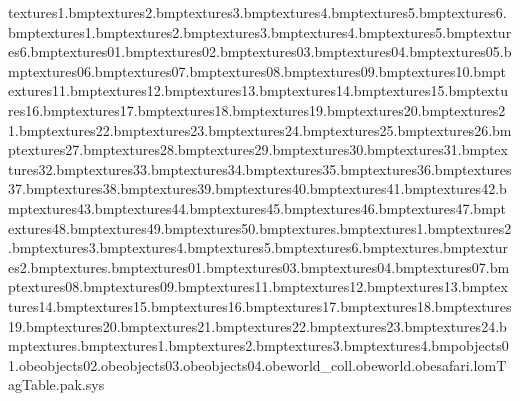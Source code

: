 textures\grassedge1.bmp textures\grassedge2.bmp textures\grassedge3.bmp textures\grassedge4.bmp textures\grassedge5.bmp textures\grassedge6.bmp textures\grassshad1.bmp textures\grassshad2.bmp textures\grassshad3.bmp textures\grassshad4.bmp textures\grassshad5.bmp textures\grassshad6.bmp textures\rockent01.bmp textures\rockent02.bmp textures\rockent03.bmp textures\rockent04.bmp textures\rockent05.bmp textures\rockent06.bmp textures\rockent07.bmp textures\rockent08.bmp textures\rockent09.bmp textures\rockent10.bmp textures\rockent11.bmp textures\rockent12.bmp textures\rockent13.bmp textures\rockent14.bmp textures\rockent15.bmp textures\rockent16.bmp textures\rockent17.bmp textures\rockent18.bmp textures\rockent19.bmp textures\rockent20.bmp textures\rockent21.bmp textures\rockent22.bmp textures\rockent23.bmp textures\rockent24.bmp textures\rockent25.bmp textures\rockent26.bmp textures\rockent27.bmp textures\rockent28.bmp textures\rockent29.bmp textures\rockent30.bmp textures\rockent31.bmp textures\rockent32.bmp textures\rockent33.bmp textures\rockent34.bmp textures\rockent35.bmp textures\rockent36.bmp textures\rockent37.bmp textures\rockent38.bmp textures\rockent39.bmp textures\rockent40.bmp textures\rockent41.bmp textures\rockent42.bmp textures\rockent43.bmp textures\rockent44.bmp textures\rockent45.bmp textures\rockent46.bmp textures\rockent47.bmp textures\rockent48.bmp textures\rockent49.bmp textures\rockent50.bmp textures\rope.bmp textures\sandbed1.bmp textures\sandbed2.bmp textures\sandbed3.bmp textures\sandbed4.bmp textures\sandbed5.bmp textures\sandbed6.bmp textures\sandbedrock.bmp textures\sandbedrock2.bmp textures\stonepal.bmp textures\wall01.bmp textures\wall03.bmp textures\wall04.bmp textures\wall07.bmp textures\wall08.bmp textures\wall09.bmp textures\wall11.bmp textures\wall12.bmp textures\wall13.bmp textures\wall14.bmp textures\wall15.bmp textures\wall16.bmp textures\wall17.bmp textures\wall18.bmp textures\wall19.bmp textures\wall20.bmp textures\wall21.bmp textures\wall22.bmp textures\wall23.bmp textures\wall24.bmp textures\wallblank.bmp textures\wbridge1.bmp textures\wbridge2.bmp textures\wbridge3.bmp textures\wbridge4.bmp objects\box01.obe objects\box02.obe objects\cage03.obe objects\box04.obe world_coll.obe world.obe safari.lom TagTable.pak.sys 